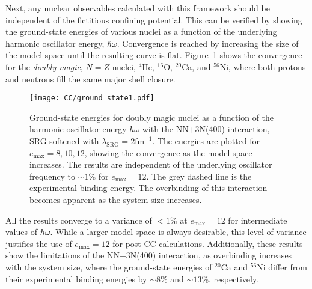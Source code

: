 \documentclass[thesis.tex]{subfiles}
\begin{document}
Next, any nuclear observables calculated with this framework should be independent of the fictitious confining potential.  This can be verified by showing the ground-state energies of various nuclei as a function of the underlying harmonic oscillator energy, $\hbar\omega$.  Convergence is reached by increasing the size of the model space until the resulting curve is flat.  Figure\ \ref{fig:Ground_State1} shows the convergence for the \textit{doubly-magic}, $N=Z$ nuclei, ${}^{4}$He, ${}^{16}$O, ${}^{20}$Ca, and ${}^{56}$Ni, where both protons and neutrons fill the same major shell closure.
\begin{figure}[h!]
  \centering
  \texttt{[image: CC/ground\_state1.pdf]}
  \caption{Ground-state energies for doubly magic nuclei as a function of the harmonic oscillator energy $\hbar\omega$ with the NN+3N(400) interaction, SRG softened with $\lambda_{\mathrm{SRG}}=2\mathrm{fm}^{-1}$.  The energies are plotted for $e_\mathrm{max}=8,10,12$, showing the convergence as the model space increases.  The results are independent of the underlying oscillator frequency to $\sim 1\%$ for $e_\mathrm{max}=12$.  The grey dashed line is the experimental binding energy.  The overbinding of this interaction becomes apparent as the system size increases.}
  \label{fig:Ground_State1}
\end{figure}
All the results converge to a variance of $<1\%$ at $e_{\mathrm{max}}=12$ for intermediate values of $\hbar\omega$.  While a larger model space is always desirable, this level of variance justifies the use of $e_{\mathrm{max}}=12$ for post-CC calculations.  Additionally, these results show the limitations of the NN+3N(400) interaction, as overbinding increases with the system size, where the ground-state energies of ${}^{20}$Ca and ${}^{56}$Ni differ from their experimental binding energies by $\sim 8\%$ and $\sim 13\%$, respectively.
\end{document}
